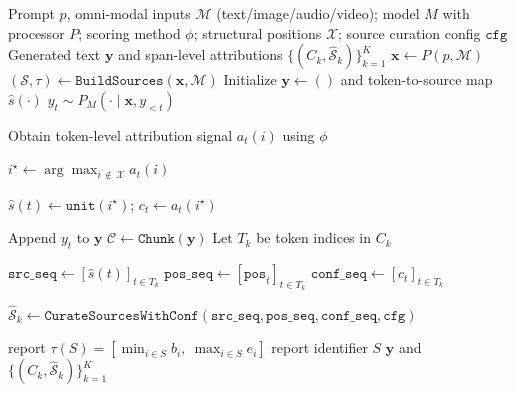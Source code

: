 \begin{algorithm}[t]
\tablesize
\caption{OmniTrace: Generation-Time Span-Level Attribution for Omni-Modal LLMs}
\label{alg:omnitrace}
\begin{algorithmic}[1]
\Require Prompt $p$, omni-modal inputs $\mathcal{M}$ (text/image/audio/video);
model $M$ with processor $P$; scoring method $\phi$; structural positions
$\mathcal{X}$; source curation config $\texttt{cfg}$
\Ensure Generated text $\mathbf{y}$ and span-level attributions $\{(C_k,\hat{\mathcal{S}}_k)\}_{k=1}^K$
\State $\mathbf{x} \leftarrow P(p,\mathcal{M})$
\State $(\mathcal{S}, \tau) \leftarrow \texttt{BuildSources}(\mathbf{x}, \mathcal{M})$
\vspace{0.3em}
\State Initialize $\mathbf{y} \leftarrow ()$ and token-to-source map $\hat{s}(\cdot)$
    \State $y_t \sim P_M(\cdot \mid \mathbf{x}, y_{<t})$

    \State Obtain token-level attribution signal $a_t(i)$ using $\phi$

    \State $i^\star \leftarrow
    \arg\max_{i \,\notin\, \mathcal{X}} a_t(i)$

    \State $\hat{s}(t) \leftarrow \texttt{unit}(i^\star)$;\quad
    $c_t \leftarrow a_t(i^\star)$

    \State Append $y_t$ to $\mathbf{y}$
\EndFor
\vspace{0.3em}
\State $\mathcal{C} \leftarrow \texttt{Chunk}(\mathbf{y})$
    \State Let $T_k$ be token indices in $C_k$

    \State $\texttt{src\_seq} \leftarrow [\hat{s}(t)]_{t\in T_k}$
    \State $\texttt{pos\_seq} \leftarrow [\texttt{pos}_t]_{t\in T_k}$
    \State $\texttt{conf\_seq} \leftarrow [c_t]_{t\in T_k}$

    \State $\hat{\mathcal{S}}_k \leftarrow
    \texttt{CurateSourcesWithConf}(
    \texttt{src\_seq},
    \texttt{pos\_seq},
    \texttt{conf\_seq},
    \texttt{cfg})$

            \State report $\tau(S) = [\min_{i \in S} b_i,\ \max_{i \in S} e_i]$
        \Else
            \State report identifier $S$
        \EndIf
    \EndFor
\EndFor
\vspace{0.3em}
\State \Return $\mathbf{y}$ and $\{(C_k,\hat{\mathcal{S}}_k)\}_{k=1}^K$
\end{algorithmic}
\end{algorithm}
